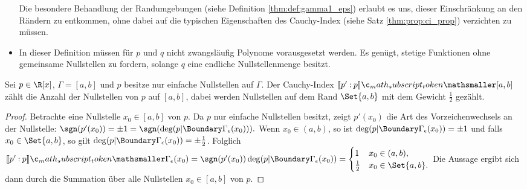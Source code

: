 \documentclass{mythesis}
\begin{document}
\begin{definition}
\begin{note}
\begin{itemize}
                Die besondere Behandlung der Randumgebungen (siehe Definition \ref{thm:def:gamma1_eps}) erlaubt es uns, dieser Einschränkung an den Rändern zu entkommen, ohne dabei auf die typischen Eigenschaften des Cauchy-Index (siehe Satz \ref{thm:prop:ci_prop}) verzichten zu müssen.
            \item
                In dieser Definition müssen für $p$ und $q$ nicht zwangsläufig Polynome vorausgesetzt werden.
                Es genügt, stetige Funktionen ohne gemeinsame Nullstellen zu fordern, solange $q$ eine endliche Nullstellenmenge besitzt.
        \end{itemize}
    \end{note}
\end{definition}


\begin{example} \label{thm:ex:ci_roots}
    Sei $p \in \R[x]$, $\Gamma = [a,b]$ und $p$ besitze nur einfache Nullstellen auf $\Gamma$.
    Der Cauchy-Index $\Index{[a,b]}{p'}{p}$ zählt die Anzahl der Nullstellen von $p$ auf $[a,b]$, dabei werden Nullstellen auf dem Rand $\Set{a,b}$ mit dem Gewicht $\frac{1}{2}$ gezählt.
    \begin{proof}
        Betrachte eine Nullstelle $x_0 \in [a,b]$ von $p$.
        Da $p$ nur einfache Nullstellen besitzt, zeigt $p'(x_0)$ die Art des Vorzeichenwechsels an der Nullstelle:
        \begin{math}
            \sgn(p'(x_0)) = \pm 1 = \sgn(\deg(p|\Boundary\Gamma_\epsilon(x_0))).
        \end{math}
        Wenn $x_0 \in (a,b)$, so ist $\deg(p|\Boundary\Gamma_\epsilon(x_0)) = \pm 1$ und falls $x_0 \in \Set{a,b}$, so gilt $\deg(p|\Boundary\Gamma_\epsilon(x_0)) = \pm \frac{1}{2}$.
        Folglich
        \begin{math}
            \Index{\Gamma_\epsilon(x_0)}{p'}{p}
            = \sgn(p'(x_0)) \deg(p|\Boundary\Gamma_\epsilon(x_0)) = \begin{cases}
                1 & x_0 \in (a,b), \\
                \frac{1}{2} & x_0 \in \Set{a,b}.
            \end{cases}
        \end{math}
        Die Aussage ergibt sich dann durch die Summation über alle Nullstellen $x_0 \in [a,b]$ von $p$.
    \end{proof}
\end{example}
\end{document}
